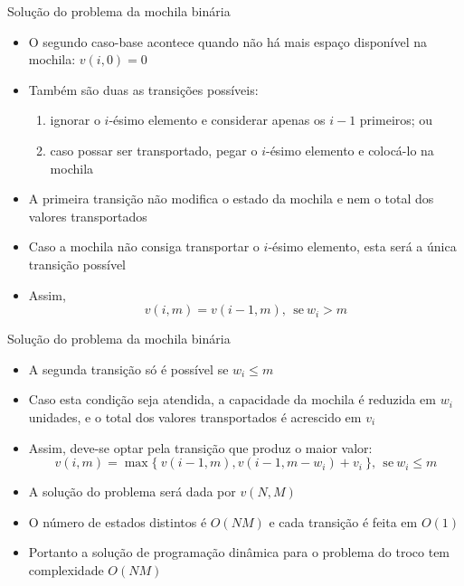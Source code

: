\begin{frame}[fragile]{Solução do problema da mochila binária}

    \begin{itemize}
        \item O segundo caso-base acontece quando não há mais espaço disponível na mochila:
            $v(i, 0) = 0$

        \item Também são duas as transições possíveis:
        \begin{enumerate}
            \item ignorar o $i$-ésimo elemento e considerar apenas os $i - 1$ primeiros; ou
            \item caso possar ser transportado, pegar o $i$-ésimo elemento e colocá-lo na
                mochila
        \end{enumerate}

        \item A primeira transição não modifica o estado da mochila e nem o total dos valores
            transportados

        \item Caso a mochila não consiga transportar o $i$-ésimo elemento, esta será a única
        transição possível

        \item Assim,
        \[
            v(i, m) = v(i - 1, m), \ \ \mbox{se}\ w_i > m
        \]

    \end{itemize}

\end{frame}

\begin{frame}[fragile]{Solução do problema da mochila binária}

    \begin{itemize}
        \item A segunda transição só é possível se $w_i \leq m$

        \item Caso esta condição seja atendida, a capacidade da mochila é reduzida em $w_i$
            unidades, e o total dos valores transportados é acrescido em $v_i$

        \item Assim, deve-se optar pela transição que produz o maior valor:
        \[
            v(i, m) = \max\{\ v(i -1, m), v(i - 1, m - w_i) + v_i\ \}, \ \ \mbox{se}\ w_i \leq m
        \]

        \item A solução do problema será dada por $v(N, M)$

        \item O número de estados distintos é $O(NM)$ e cada transição é feita em $O(1)$

        \item Portanto a solução de programação dinâmica para o problema do troco tem
            complexidade $O(NM)$
    \end{itemize}

\end{frame}

